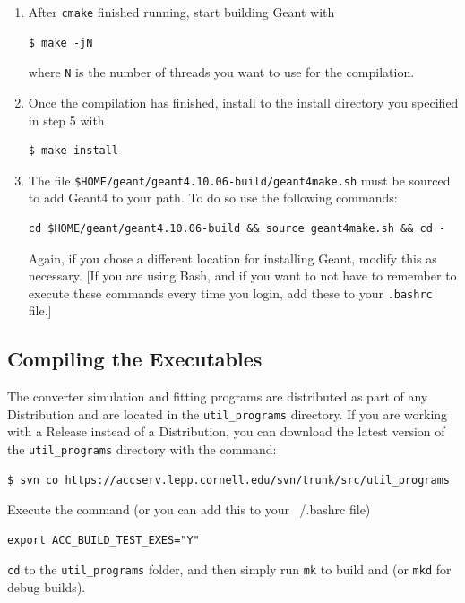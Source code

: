 \documentclass[12pt]{article}
\begin{document}
\begin{enumerate}
\item
After \texttt{cmake} finished running, start building Geant with
\begin{verbatim}
$ make -jN
\end{verbatim}
where \texttt{N} is the number of threads you want to use for the compilation.

\item
Once the compilation has finished, install to the install directory you specified in step 5 with
\begin{verbatim}
$ make install
\end{verbatim}

\item
The file \texttt{\$HOME/geant/geant4.10.06-build/geant4make.sh} must be sourced to add Geant4 to your path.
To do so use the following commands:
\begin{verbatim}
cd $HOME/geant/geant4.10.06-build && source geant4make.sh && cd -
\end{verbatim}
Again, if you chose a different location for installing Geant, modify this as necessary. [If you
are using Bash, and if you want to not have to remember to execute these commands every time you
login, add these to your \texttt{.bashrc} file.]
\end{enumerate}


\subsection{Compiling the Executables} The converter simulation and fitting programs are distributed
as part of any \bmad Distribution and are located in the \texttt{util\_programs} directory. If you
are working with a Release instead of a Distribution, you can download the latest version of the
\texttt{util\_programs} directory with the command:
\begin{verbatim}
$ svn co https://accserv.lepp.cornell.edu/svn/trunk/src/util_programs
\end{verbatim}
Execute the command (or you can add this to your ~/.bashrc file)
\begin{verbatim}
export ACC_BUILD_TEST_EXES="Y"
\end{verbatim}
\texttt{cd} to the \texttt{util\_programs} folder, and then simply run \texttt{mk} to build \exes and \exef  (or \texttt{mkd} for debug builds).

\end{document}
